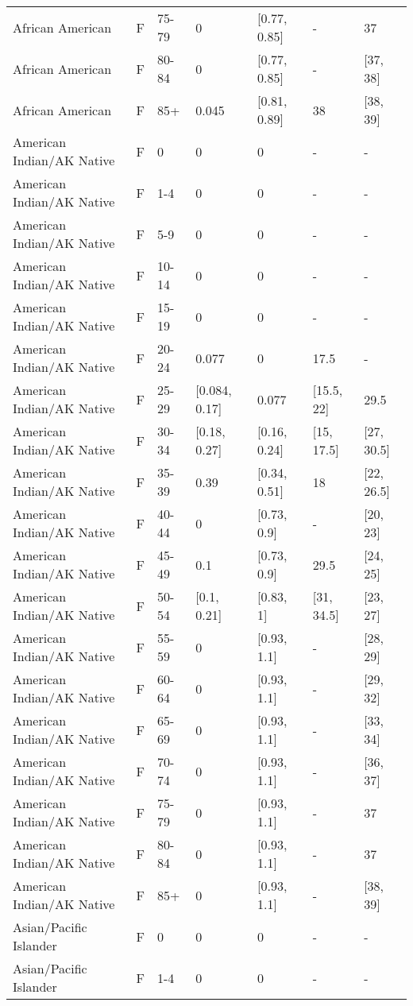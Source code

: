 \begin{table}[ht]
\begin{tabular}{lllllll}
  African American & F & 75-79 & 0 & [0.77, 0.85] & - & 37 \\ 
  African American & F & 80-84 & 0 & [0.77, 0.85] & - & [37, 38] \\ 
  African American & F & 85+ & 0.045 & [0.81, 0.89] & 38 & [38, 39] \\ 
  American Indian/AK Native & F & 0 & 0 & 0 & - & - \\ 
  American Indian/AK Native & F & 1-4 & 0 & 0 & - & - \\ 
  American Indian/AK Native & F & 5-9 & 0 & 0 & - & - \\ 
  American Indian/AK Native & F & 10-14 & 0 & 0 & - & - \\ 
  American Indian/AK Native & F & 15-19 & 0 & 0 & - & - \\ 
  American Indian/AK Native & F & 20-24 & 0.077 & 0 & 17.5 & - \\ 
  American Indian/AK Native & F & 25-29 & [0.084, 0.17] & 0.077 & [15.5, 22] & 29.5 \\ 
  American Indian/AK Native & F & 30-34 & [0.18, 0.27] & [0.16, 0.24] & [15, 17.5] & [27, 30.5] \\ 
  American Indian/AK Native & F & 35-39 & 0.39 & [0.34, 0.51] & 18 & [22, 26.5] \\ 
  American Indian/AK Native & F & 40-44 & 0 & [0.73, 0.9] & - & [20, 23] \\ 
  American Indian/AK Native & F & 45-49 & 0.1 & [0.73, 0.9] & 29.5 & [24, 25] \\ 
  American Indian/AK Native & F & 50-54 & [0.1, 0.21] & [0.83, 1] & [31, 34.5] & [23, 27] \\ 
  American Indian/AK Native & F & 55-59 & 0 & [0.93, 1.1] & - & [28, 29] \\ 
  American Indian/AK Native & F & 60-64 & 0 & [0.93, 1.1] & - & [29, 32] \\ 
  American Indian/AK Native & F & 65-69 & 0 & [0.93, 1.1] & - & [33, 34] \\ 
  American Indian/AK Native & F & 70-74 & 0 & [0.93, 1.1] & - & [36, 37] \\ 
  American Indian/AK Native & F & 75-79 & 0 & [0.93, 1.1] & - & 37 \\ 
  American Indian/AK Native & F & 80-84 & 0 & [0.93, 1.1] & - & 37 \\ 
  American Indian/AK Native & F & 85+ & 0 & [0.93, 1.1] & - & [38, 39] \\ 
  Asian/Pacific Islander & F & 0 & 0 & 0 & - & - \\ 
  Asian/Pacific Islander & F & 1-4 & 0 & 0 & - & - \\ 

\end{tabular}
\end{table}
